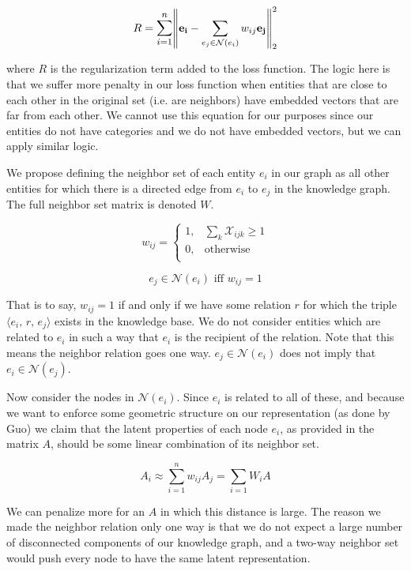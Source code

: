 \documentclass[pageno]{final_paper}
\begin{document}
$$R = \mathlarger{\sum_{i=1}^n} \norm{\mathbf{e_i} - \sum_{e_j \in \mathcal{N}(e_i)} w_{ij}
\mathbf{e_j}}_2^2$$

where $R$ is the regularization term added to the loss function. The logic here
is that we suffer more penalty in our loss function when entities that are close
to each other in the original set (i.e. are neighbors) have embedded vectors
that are far from each other. We cannot use this equation for our purposes since
our entities do not have categories and we do not have embedded vectors, but we
can apply similar logic.

We propose defining the neighbor set of each entity $e_i$ in our graph as all
other entities for which there is a directed edge from $e_i$ to $e_j$ in the
knowledge graph. The full neighbor set matrix is denoted $W$.

\begin{equation}
    \label{eq: new wij}
    w_{ij} =
    \begin{cases}
        1, & \sum_k \mathcal{X}_{ijk} \geq 1 \\
        0, & \text{otherwise} \\
    \end{cases}
\end{equation}

\begin{equation}
    \label{eq: new neighbor set}
    e_j \in \mathcal{N}(e_i) \text{ iff } w_{ij} = 1
\end{equation}

That is to say, $w_{ij} = 1$ if and only if we have some relation $r$ for which
the triple $\langle e_i,\,r,\,e_j \rangle$ exists in the knowledge base. We do
not consider entities which are related to $e_i$ in such a way that $e_i$ is the
recipient of the relation. Note that this means the neighbor relation goes one
way. $e_j \in \mathcal{N}(e_i)$ does not imply that $e_i \in \mathcal{N}(e_j)$.

Now consider the nodes in $\mathcal{N}(e_i)$. Since $e_i$ is related to all of
these, and because we want to enforce some geometric structure on our
representation (as done by Guo) we claim that the latent properties of each node
$e_i$, as provided in the matrix $A$, should be some linear combination of its
neighbor set.

$$ A_i \approx \sum_{i=1}^n w_{ij}A_j = \sum_{i=1} W_iA$$

We can penalize more for an $A$ in which this distance is large. The reason we
made the neighbor relation only one way is that we do not expect a large number
of disconnected components of our knowledge graph, and a two-way neighbor set
would push every node to have the same latent representation. \\
\end{document}
